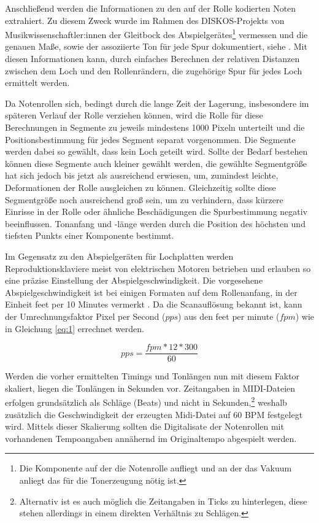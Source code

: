 Anschließend werden die Informationen zu den auf der Rolle kodierten Noten extrahiert.
Zu diesem Zweck wurde im Rahmen des DISKOS-Projekts von Musikwissenschaftler:innen der Gleitbock des Abspielgerätes\footnote{Die Komponente auf der die Notenrolle aufliegt und an der das Vakuum anliegt das für die Tonerzeugung nötig ist.} vermessen und die genauen Maße, sowie der assoziierte Ton für jede Spur dokumentiert, siehe \textcite[]{mxp_2002548}.
Mit diesen Informationen kann, durch einfaches Berechnen der relativen Distanzen zwischen dem Loch und den Rollenrändern, die zugehörige Spur für jedes Loch ermittelt werden.

Da Notenrollen sich, bedingt durch die lange Zeit der Lagerung, insbesondere im späteren Verlauf der Rolle verziehen können, wird die Rolle für diese Berechnungen in Segmente zu jeweils mindestens 1000 Pixeln unterteilt und die Positionsbestimmung für jedes Segment separat vorgenommen.
Die Segmente werden dabei so gewählt, dass kein Loch geteilt wird.
Sollte der Bedarf bestehen können diese Segmente auch kleiner gewählt werden, die gewählte Segmentgröße hat sich jedoch bis jetzt als ausreichend erwiesen, um, zumindest leichte, Deformationen der Rolle ausgleichen zu können.
Gleichzeitig sollte diese Segmentgröße noch ausreichend groß sein, um zu verhindern, dass kürzere Einrisse in der Rolle oder ähnliche Beschädigungen die Spurbestimmung negativ beeinflussen.
Tonanfang und -länge werden durch die Position des höchsten und tiefsten Punkts einer Komponente bestimmt.

Im Gegensatz zu den Abspielgeräten für Lochplatten werden Reproduktionsklaviere meist von elektrischen Motoren betrieben und erlauben so eine präzise Einstellung der Abspielgeschwindigkeit.
Die vorgesehene Abspielgeschwindigkeit ist bei einigen Formaten auf dem Rollenanfang, in der Einheit feet per 10 Minutes vermerkt \parencite[63]{colmenares_2011}.
Da die Scanauflösung bekannt ist, kann der Umrechnungsfaktor Pixel per Second ($pps$) aus den feet per minute ($fpm$) wie in Gleichung \ref{eq:1} errechnet werden.

\begin{equation} \label{eq:1}
    pps = \frac{fpm * 12 * 300}{60}
\end{equation}

Werden die vorher ermittelten Timings und Tonlängen nun mit diesem Faktor skaliert, liegen die Tonlängen in Sekunden vor.
Zeitangaben in MIDI-Dateien erfolgen grundsätzlich als Schläge (Beats) und nicht in Sekunden,\footnote{Alternativ ist es auch möglich die Zeitangaben in Ticks zu hinterlegen, diese stehen allerdings in einem direkten Verhältnis zu Schlägen.} weshalb zusätzlich die Geschwindigkeit der erzeugten Midi-Datei auf 60 BPM festgelegt wird.
Mittels dieser Skalierung sollten die Digitalisate der Notenrollen mit vorhandenen Tempoangaben annähernd im Originaltempo abgespielt werden.



